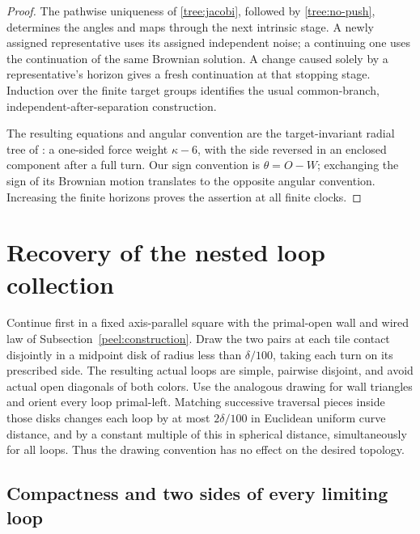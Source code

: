 \begin{proof}
The pathwise uniqueness of \eqref{tree:jacobi}, followed by
\eqref{tree:no-push}, determines the angles and maps through the next
intrinsic stage.  A newly assigned representative uses its assigned
independent noise; a continuing one uses the continuation of the same
Brownian solution.  A change caused solely by a representative's
horizon gives a fresh continuation at that stopping stage.  Induction
over the finite target groups identifies the usual common-branch,
independent-after-separation construction.

The resulting equations and angular convention are the target-invariant
radial tree of
\citet[Propositions~3.13--3.14 and Section~4.2]{Sheffield2009Exploration}:
a one-sided force weight $\kappa-6$, with the side reversed in an
enclosed component after a full turn.  Our sign convention is
$\theta=O-W$; exchanging the sign of its Brownian motion translates
to the opposite angular convention.  Increasing the finite horizons
proves the assertion at all finite clocks.
\end{proof}

\section{Recovery of the nested loop collection}
\label{sec:loops}

Continue first in a fixed axis-parallel square with the primal-open
wall and wired law of Subsection~\ref{peel:construction}.  Draw the two
pairs at each tile contact disjointly in a midpoint disk of radius
less than $\delta/100$, taking each turn on its prescribed side.
The resulting actual loops are simple, pairwise disjoint, and avoid
actual open diagonals of both colors.  Use the analogous drawing for
wall triangles and orient every loop primal-left.  Matching successive
traversal pieces inside those disks changes each loop by at most
$2\delta/100$ in Euclidean uniform curve distance, and by a constant
multiple of this in spherical distance, simultaneously for all loops.
Thus the drawing convention has no effect on the desired topology.

\subsection{Compactness and two sides of every limiting loop}
\label{loop:compactness}

